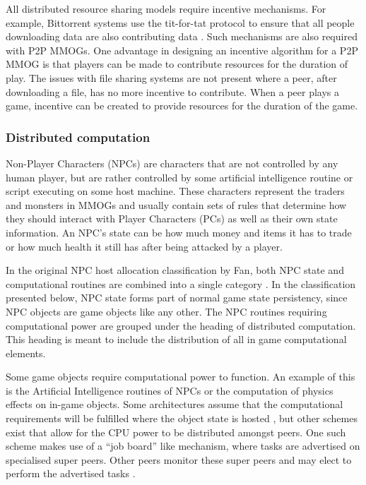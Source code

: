 \documentclass[10pt,a4paper,journal,cspaper,compsoc]{IEEEtran}
\begin{document}
All distributed resource sharing models require incentive mechanisms. For example, Bittorrent systems use the tit-for-tat protocol to ensure that all
people downloading data are also contributing data \cite{tit_for_tat}. Such mechanisms are also required with P2P MMOGs. One advantage in designing
an incentive algorithm for a P2P MMOG is that players can be made to contribute resources for the duration of play. The issues with file sharing
systems are not present where a peer, after downloading a file, has no more incentive to contribute. When a peer plays a game, incentive can be
created to provide resources for the duration of the game.

\subsubsection{Distributed computation}

Non-Player Characters (NPCs) are characters that are not controlled by any human player, but are rather controlled by some artificial intelligence
routine or script executing on some host machine. These characters represent the traders and monsters in MMOGs and usually contain sets of rules that
determine how they should interact with Player Characters (PCs) as well as their own state information. An NPC's state can be how much money and
items it has to trade or how much health it still has after being attacked by a player.

In the original NPC host allocation classification by Fan, both NPC state and computational routines are combined into a single category
\cite{Fan_phd}. In the classification presented below, NPC state forms part of normal game state persistency, since NPC objects are game objects like
any other. The NPC routines requiring computational power are grouped under the heading of distributed computation. This heading is meant to include
the distribution of all in game computational elements.

Some game objects require computational power to function. An example of this is the Artificial Intelligence routines of NPCs or the computation of
physics effects on in-game objects. Some architectures assume that the computational requirements will be fulfilled where the object state is hosted
\cite{solipsis}, but other schemes exist that allow for the CPU power to be distributed amongst peers. One such scheme makes use of a ``job board''
like mechanism, where tasks are advertised on specialised super peers. Other peers monitor these super peers and may elect to perform the advertised
tasks \cite{fan_mediator_paper}.
\end{document}
